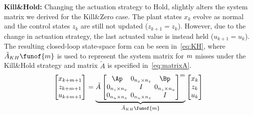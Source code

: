 \textbf{Kill\&Hold: }%
%
Changing the actuation strategy to Hold, slightly alters the system matrix we derived for the Kill\&Zero case.
The plant states $x_k$ evolve as normal and the control states $z_k$ are still not updated ($z_{k+1} = z_k$).
However, due to the change in actuation strategy, the last actuated value is instead held ($u_{k+1} = u_k$).
The resulting closed-loop state-space form can be seen in~\eqref{eq:KH}, where $\tilde A_{KH}\funof{\nummisses}$ is used to represent the system matrix for $m$ misses under the Kill\&Hold strategy and matrix $\tilde A$ is specified in~\eqref{eq:matrixA}.
%
\begin{equation}
    \setlength\arraycolsep{2pt}
    \label{eq:KH}
    \begin{bmatrix}
        x_{k+\nummisses+1} \\
        z_{k+\nummisses+1} \\
        u_{k+\nummisses+1}
    \end{bmatrix} = 
    \underbrace{ \tilde A \begin{bmatrix}
        \Ap                                         & 0_{n_x \times n_z}  & \Bp \\
        0_{n_z \times n_x}    & I                                         & 0_{n_z \times n_u} \\
        0_{n_u \times n_x}   & 0_{n_u \times n_z}   & I
    \end{bmatrix}^{\nummisses}}_{\tilde A_{KH}\funof{\nummisses}}
    \begin{bmatrix}
        x_{k} \\
        z_{k} \\
        u_{k}
    \end{bmatrix}
\end{equation}

